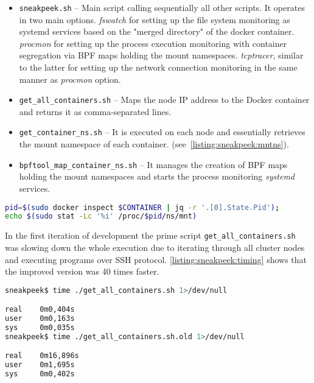 \begin{itemize}[noitemsep]
	\item \texttt{sneakpeek.sh} -- Main script calling sequentially all other scripts. It operates in two main options. \textit{fswatch} for setting up the file system monitoring as systemd services based on the "merged directory" of the docker container. \textit{procmon} for setting up the process execution monitoring with container segregation via BPF maps holding the mount namespaces. \textit{tcptracer}, similar to the latter for setting up the network connection monitoring in the same manner as \textit{procmon} option.
	\item \texttt{get\_all\_containers.sh} -- Maps the node IP address to the Docker container and returns it as comma-separated lines.
	\item \texttt{get\_container\_ns.sh} -- It is executed on each node and essentially retrieves the mount namespace of each container. (see~\autoref{listing:sneakpeek:mntns}).
	\item \texttt{bpftool\_map\_container\_ns.sh} -- It manages the creation of BPF maps holding the mount namespaces and starts the process monitoring \textit{systemd} services.
\end{itemize}

\begin{lstlisting}[language=bash, style=custom, caption={The main piece of script code for retrieving the muont namespace inode number of the given container. This is executed for each container on a corresponding node.}, label=listing:sneakpeek:mntns]
pid=$(sudo docker inspect $CONTAINER | jq -r '.[0].State.Pid');
echo $(sudo stat -Lc '%i' /proc/$pid/ns/mnt)
\end{lstlisting}

In the first iteration of development the prime script \texttt{get\_all\_containers.sh} was slowing down the whole execution due to iterating through all cluster nodes and executing programs over SSH protocol. \autoref{listing:sneakpeek:timing} shows that the improved version was 40 times faster.

\begin{lstlisting}[language=bash, label=listing:sneakpeek:timing]
sneakpeek$ time ./get_all_containers.sh 1>/dev/null

real    0m0,404s
user    0m0,163s
sys     0m0,035s
sneakpeek$ time ./get_all_containers.sh.old 1>/dev/null

real    0m16,896s
user    0m1,695s
sys     0m0,402s
\end{lstlisting}


